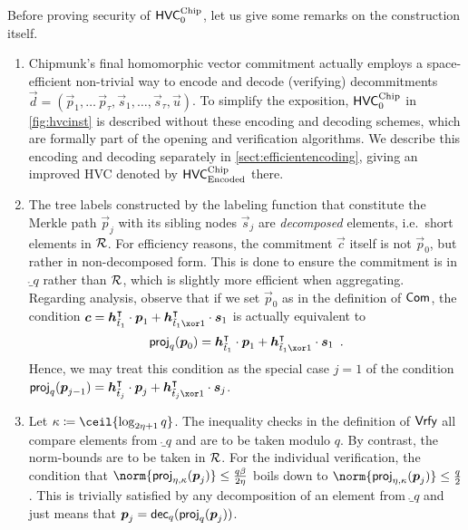 \begin{remark}\label{rmk:hvc}
Before proving security of $\mathsf{HVC}^{\textup{Chip}}_{0}$, let us give some remarks on the construction itself.
\begin{enumerate}
\item Chipmunk's final homomorphic vector commitment actually employs a space-efficient non-trivial way to encode and decode (verifying) decommitments $\vec{d} = (\vec{p}_1,\ldots\,\vec{p}_\tau,\vec{s}_1,\ldots,\vec{s}_\tau,\vec{u})$.
To simplify the exposition, $\mathsf{HVC}^{\textup{Chip}}_{0}$ in \autoref{fig:hvcinst} is described without these encoding and decoding schemes, which are formally part of the opening and verification algorithms.
We describe this encoding and decoding separately in \autoref{sect:efficientencoding}, giving an improved HVC denoted by $\mathsf{HVC}_{\textup{Encoded}}^{\textup{Chip}}$ there.
\item The tree labels constructed by the labeling function that constitute the Merkle path $\vec{p}_j$ with its sibling nodes $\vec{s}_j$ are \emph{decomposed} elements, i.e.\ short elements in $\mathcal{R}$.
For efficiency reasons, the commitment $\vec{c}$ itself is not $\vec{p}_0$, but rather in non-decomposed form. This is done to ensure the commitment is in $\ring_q$ rather than $\mathcal{R}$, which is slightly more efficient when aggregating.
Regarding analysis, observe that if we set $\vec{p}_0$ as in the definition of $\mathsf{Com}$, the condition $\vec{c} = \vec{h}_{\tilde t_1}^\transpose\cdot \vec{p}_{1} + \vec{h}_{\tilde t_1 \xor 1}^\transpose \cdot \vec{s}_{1}$ is actually equivalent to
\[
\projmod{q}(\vec{p}_0) = \vec{h}_{\tilde t_1}^\transpose\cdot \vec{p}_{1} + \vec{h}_{\tilde t_1 \xor 1}^\transpose \cdot \vec{s}_{1}\enspace.
\]
Hence, we may treat this condition as the special case $j=1$ of the condition $\projmod{q}(\vec{p}_{j-1}) = \vec{h}_{\tilde t_j}^\transpose\cdot \vec{p}_{j} + \vec{h}_{\tilde t_j \xor 1}^\transpose \cdot \vec{s}_{j}$.
\item Let $\limbs \coloneqq \ceil{\log_{2\eta+1} q}$.
The inequality checks in the definition of $\mathsf{Vrfy}$ all compare elements from $\ring_q$ and are to be taken modulo $q$. By contrast, the norm-bounds are to be taken in $\mathcal{R}$.
For the individual verification, the condition that $\norm{\projring(\vec{p}_j)} \leq \tfrac{q\beta}{2\eta}$ boils down to $\norm{\projring(\vec{p}_j)} \leq \tfrac{q}{2}$.
This is trivially satisfied by any decomposition of an element from $\ring_q$ and just means that $\boldsymbol{p}_j = \mathsf{dec}_{q}(\mathsf{proj}_{q}(\boldsymbol{p}_j))$.

\end{enumerate}
\end{remark}
